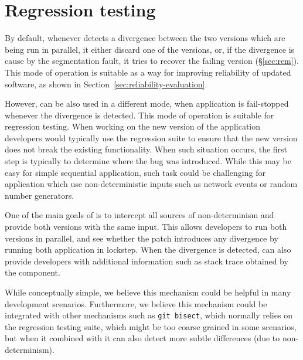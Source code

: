 \section{Regression testing}
\label{sec:testing}

By default, whenever \mx detects a divergence between the two versions which
are being run in parallel, it either discard one of the versions, or, if the
divergence is cause by the segmentation fault, it tries to recover the failing
version (\S\ref{sec:rem}). This mode of operation is suitable as a way for
improving reliability of updated software, as shown in
Section~\ref{sec:reliability-evaluation}.

However, \mx can be also used in a different mode, when application is
fail-stopped whenever the divergence is detected. This mode of operation is
suitable for regression testing. When working on the new version of the
application developers would typically use the regression suite to ensure that
the new version does not break the existing functionality. When such situation
occurs, the first step is typically to determine where the bug was introduced.
While this may be easy for simple sequential application, such task could be
challenging for application which use non-deterministic inputs such as network
events or random number generators.

One of the main goals of \mx is to intercept all sources of non-determinism and
provide both versions with the same input. This allows developers to run both
versions in parallel, and see whether the patch introduces any divergence by
running both application in lockstep. When the divergence is detected, \mx can
also provide developers with additional information such as stack trace
obtained by the \rem component.

While conceptually simple, we believe this mechanism could be helpful in many
development scenarios. Furthermore, we believe this mechanism could be
integrated with other mechanisms such as \lstinline`git bisect`, which normally
relies on the regression testing suite, which might be too coarse grained in
some scenarios, but when it combined with \mx it can also detect more subtle
differences (\eg due to non-determinism).
